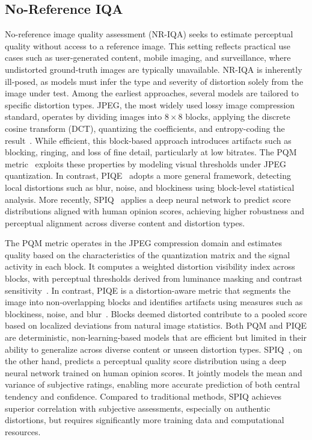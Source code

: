 \subsection{No-Reference IQA}\label{sec:no_reference_iqa}

No-reference image quality assessment (NR-IQA) seeks to estimate perceptual quality without access to a reference image. This setting reflects practical use cases such as user-generated content, mobile imaging, and surveillance, where undistorted ground-truth images are typically unavailable. NR-IQA is inherently ill-posed, as models must infer the type and severity of distortion solely from the image under test. Among the earliest approaches, several models are tailored to specific distortion types. JPEG, the most widely used lossy image compression standard, operates by dividing images into $8 \times 8$ blocks, applying the discrete cosine transform (DCT), quantizing the coefficients, and entropy-coding the result~\cite{wallace1992jpeg}. While efficient, this block-based approach introduces artifacts such as blocking, ringing, and loss of fine detail, particularly at low bitrates. The PQM metric~\cite{wang2002pqm} exploits these properties by modeling visual thresholds under JPEG quantization. In contrast, PIQE~\cite{venkatanath2015piqe} adopts a more general framework, detecting local distortions such as blur, noise, and blockiness using block-level statistical analysis. More recently, SPIQ~\cite{chen2022spiq} applies a deep neural network to predict score distributions aligned with human opinion scores, achieving higher robustness and perceptual alignment across diverse content and distortion types.


The PQM metric operates in the JPEG compression domain and estimates quality based on the characteristics of the quantization matrix and the signal activity in each block. It computes a weighted distortion visibility index across blocks, with perceptual thresholds derived from luminance masking and contrast sensitivity~\cite{wang2002pqm}. In contrast, PIQE is a distortion-aware metric that segments the image into non-overlapping blocks and identifies artifacts using measures such as blockiness, noise, and blur~\cite{venkatanath2015piqe}. Blocks deemed distorted contribute to a pooled score based on localized deviations from natural image statistics. Both PQM and PIQE are deterministic, non-learning-based models that are efficient but limited in their ability to generalize across diverse content or unseen distortion types. SPIQ~\cite{chen2022spiq}, on the other hand, predicts a perceptual quality score distribution using a deep neural network trained on human opinion scores. It jointly models the mean and variance of subjective ratings, enabling more accurate prediction of both central tendency and confidence. Compared to traditional methods, SPIQ achieves superior correlation with subjective assessments, especially on authentic distortions, but requires significantly more training data and computational resources.

